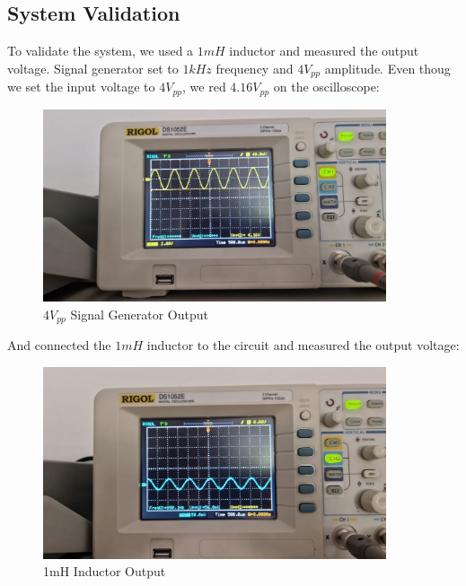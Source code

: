 \newpage{}
\thispagestyle{plain}

\subsection{System Validation}
To validate the system, we used a $1mH$ inductor and measured the output voltage. Signal generator set to $1kHz$ frequency and $4V_{pp}$ amplitude. Even thoug we set the input voltage to $4V_{pp}$, we red $4.16V_{pp}$ on the oscilloscope: 

\begin{figure}[h]
    \centering
    \includegraphics[width=0.9\textwidth]{assets/1k-input.jpg}
    \caption{$4V_{pp}$ Signal Generator Output}
    \label{fig:1k-signal-generator-output}
\end{figure}

And connected the $1mH$ inductor to the circuit and measured the output voltage:

\begin{figure}[h]
    \centering
    \includegraphics[width=0.9\textwidth]{assets/1k-1m-output.jpeg}
    \caption{1mH Inductor Output}
    \label{fig:1k-1m-output}
\end{figure}

\newpage{}
\thispagestyle{plain}

